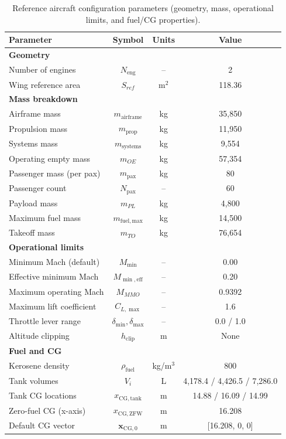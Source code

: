 \begin{table}[h]
    \centering
    \footnotesize
    \caption{Reference aircraft configuration parameters (geometry, mass, operational limits, and fuel/CG properties).}
    \begin{tabular}{l c c c}
        \hline
        Parameter & Symbol & Units & Value \\
        \hline
        \textbf{Geometry} & & & \\
        Number of engines & $N_{\mathrm{eng}}$ & -- & 2 \\
        Wing reference area & $S_{ref}$ & m$^2$ & 118.36 \\
        \hline
        \textbf{Mass breakdown} & & & \\
        Airframe mass & $m_{\mathrm{airframe}}$ & kg & 35{,}850 \\
        Propulsion mass & $m_{\mathrm{prop}}$ & kg & 11{,}950 \\
        Systems mass & $m_{\mathrm{systems}}$ & kg & 9{,}554 \\
        Operating empty mass & $m_{OE}$ & kg & 57{,}354 \\
        Passenger mass (per pax) & $m_{\mathrm{pax}}$ & kg & 80 \\
        Passenger count & $N_{\mathrm{pax}}$ & -- & 60 \\
        Payload mass & $m_{PL}$ & kg & 4{,}800 \\
        Maximum fuel mass & $m_{\mathrm{fuel,max}}$ & kg & 14{,}500 \\
        Takeoff mass & $m_{TO}$ & kg & 76{,}654 \\
        \hline
        \textbf{Operational limits} & & & \\
        Minimum Mach (default) & $M_{\min}$ & -- & 0.00 \\
        Effective minimum Mach & $M_{\min,\mathrm{eff}}$ & -- & 0.20 \\
        Maximum operating Mach & $M_{MMO}$ & -- & 0.9392 \\
        Maximum lift coefficient & $C_{L,\max}$ & -- & 1.6 \\
        Throttle lever range & $\delta_{\min},\delta_{\max}$ & -- & 0.0 / 1.0 \\
        Altitude clipping & $h_{\mathrm{clip}}$ & m & None \\
        \hline
        \textbf{Fuel and CG} & & & \\
        Kerosene density & $\rho_{\mathrm{fuel}}$ & kg/m$^3$ & 800 \\
        Tank volumes & $V_{i}$ & L & 4{,}178.4 / 4{,}426.5 / 7{,}286.0 \\
        Tank CG locations & $x_{\mathrm{CG,tank}}$ & m & 14.88 / 16.09 / 14.99 \\
        Zero-fuel CG (x-axis) & $x_{\mathrm{CG,ZFW}}$ & m & 16.208 \\
        Default CG vector & $\mathbf{x}_{\mathrm{CG,0}}$ & m & [16.208, 0, 0] \\
        \hline
    \end{tabular}
\end{table}

